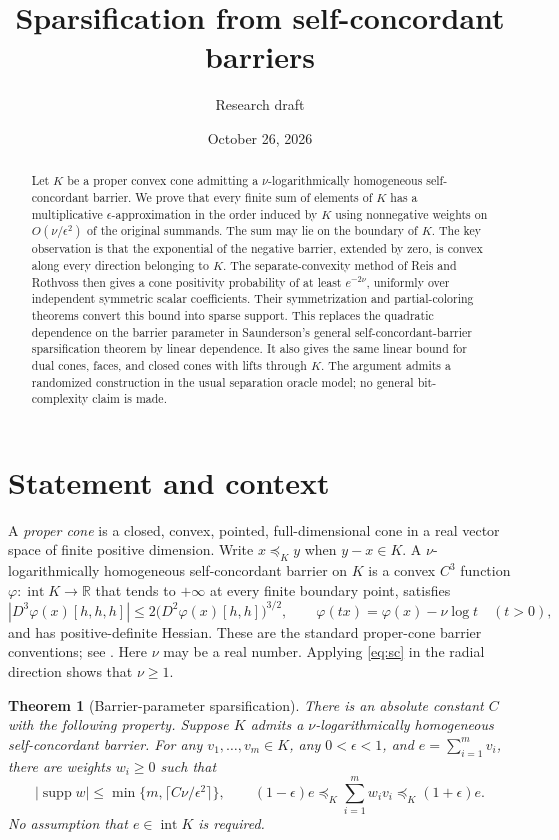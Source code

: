\documentclass[11pt]{article}
\title{Sparsification from self-concordant barriers}
\author{Research draft}
\date{October 26, 2026}
\newtheorem{theorem}{Theorem}[section]
\newcommand{\R}{\mathbb R}
\newcommand{\intr}{\operatorname{int}}
\newcommand{\supp}{\operatorname{supp}}
\begin{document}
\maketitle

\begin{abstract}
Let $K$ be a proper convex cone admitting a $\nu$-logarithmically homogeneous
self-concordant barrier. We prove that every finite sum of elements of $K$
has a multiplicative $\epsilon$-approximation in the order induced by $K$
using nonnegative weights on $O(\nu/\epsilon^2)$ of the original summands.
The sum may lie on the boundary of $K$.
The key observation is that the exponential of the negative barrier,
extended by zero, is convex along every direction belonging to $K$.
The separate-convexity method of Reis and Rothvoss then gives a cone
positivity probability of at least $e^{-2\nu}$, uniformly over independent
symmetric scalar coefficients. Their symmetrization and partial-coloring
theorems convert this bound into sparse support.
This replaces the quadratic dependence on the barrier parameter in
Saunderson's general self-concordant-barrier sparsification theorem by
linear dependence. It also gives the same linear bound for dual cones,
faces, and closed cones with lifts through $K$.
The argument admits a randomized construction in the usual separation
oracle model; no general bit-complexity claim is made.
\end{abstract}

\section{Statement and context}

A \emph{proper cone} is a closed, convex, pointed, full-dimensional cone
in a real vector space of finite positive dimension. Write $x\preceq_K y$ when
$y-x\in K$. A $\nu$-logarithmically homogeneous self-concordant barrier
on $K$ is a convex $C^3$ function $\varphi:\intr K\to\R$ that tends to
$+\infty$ at every finite boundary point, satisfies
\begin{equation}\label{eq:sc}
 |D^3\varphi(x)[h,h,h]|
 \le 2\bigl(D^2\varphi(x)[h,h]\bigr)^{3/2},
 \qquad
 \varphi(tx)=\varphi(x)-\nu\log t
 \quad(t>0),
\end{equation}
and has positive-definite Hessian. These are the standard proper-cone
barrier conventions; see \cite{NN94,Nesterov18,Saunderson25}.
Here $\nu$ may be a real number. Applying \eqref{eq:sc} in the radial
direction shows that $\nu\ge1$.

\begin{theorem}[Barrier-parameter sparsification]\label{thm:main}
There is an absolute constant $C$ with the following property.
Suppose $K$ admits a $\nu$-logarithmically homogeneous self-concordant
barrier. For any $v_1,\ldots,v_m\in K$, any $0<\epsilon<1$, and
$e=\sum_{i=1}^m v_i$, there are weights $w_i\ge0$ such that
\begin{equation}\label{eq:main}
 |\supp w|\le \min\{m,\lceil C\nu/\epsilon^2\rceil\},
 \qquad
 (1-\epsilon)e\preceq_K\sum_{i=1}^m w_i v_i
 \preceq_K(1+\epsilon)e.
\end{equation}
No assumption that $e\in\intr K$ is required.
\end{theorem}
\end{document}
